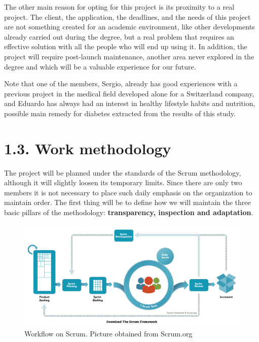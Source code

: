 	The other main reason for opting for this project is its proximity to a real project. The client, the application, the deadlines, and the needs of this project are not something created for an academic environment, like other developments already carried out during the degree, but a real problem that requires an effective solution with all the people who will end up using it. In addition, the project will require post-launch maintenance, another area never explored in the degree and which will be a valuable experience for our future.\newline
	
	Note that one of the members, Sergio, already has good experiences with a previous project in the medical field developed alone for a Switzerland company, and Eduardo has always had an interest in healthy lifestyle habits and nutrition, possible main remedy for diabetes extracted from the results of this study.\newpage

	\section*{1.3. Work methodology}
    
    The project will be planned under the standards of the Scrum\cite{Scrum} methodology, although it will slightly loosen its temporary limits. Since there are only two members it is not necessary to place such daily emphasis on the organization to maintain order. The first thing will be to define how we will maintain the three basic pillars of the methodology: \textbf{transparency, inspection and adaptation}.
    
    \begin{figure}[h]
    \centering
     \includegraphics[width=1\textwidth]{images/Scrum.png}
    \caption{Workflow on Scrum. Picture obtained from Scrum.org \cite{Scrum.org}}
    \end{figure}
    
